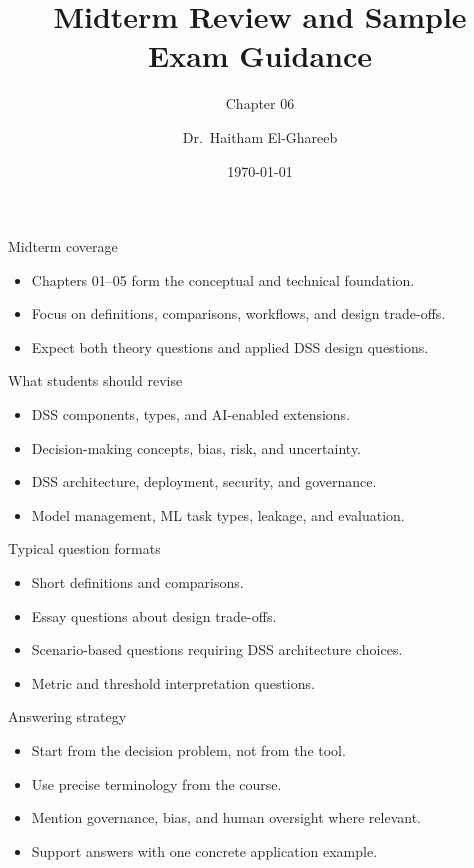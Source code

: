 \documentclass[aspectratio=169,11pt]{beamer}
\title[Midterm Review]{Midterm Review and Sample Exam Guidance}
\subtitle{Chapter 06}
\author{Dr.\ Haitham El-Ghareeb}
\institute{Faculty of Computers and Information Sciences}
\date{\today}
\begin{document}
\begin{frame}
  \titlepage
\end{frame}

\begin{frame}{Midterm coverage}
  \begin{itemize}
    \item Chapters 01--05 form the conceptual and technical foundation.
    \item Focus on definitions, comparisons, workflows, and design trade-offs.
    \item Expect both theory questions and applied DSS design questions.
  \end{itemize}
\end{frame}

\begin{frame}{What students should revise}
  \begin{itemize}
    \item DSS components, types, and AI-enabled extensions.
    \item Decision-making concepts, bias, risk, and uncertainty.
    \item DSS architecture, deployment, security, and governance.
    \item Model management, ML task types, leakage, and evaluation.
  \end{itemize}
\end{frame}

\begin{frame}{Typical question formats}
  \begin{itemize}
    \item Short definitions and comparisons.
    \item Essay questions about design trade-offs.
    \item Scenario-based questions requiring DSS architecture choices.
    \item Metric and threshold interpretation questions.
  \end{itemize}
\end{frame}

\begin{frame}{Answering strategy}
  \begin{itemize}
    \item Start from the decision problem, not from the tool.
    \item Use precise terminology from the course.
    \item Mention governance, bias, and human oversight where relevant.
    \item Support answers with one concrete application example.
  \end{itemize}
\end{frame}
\end{document}
